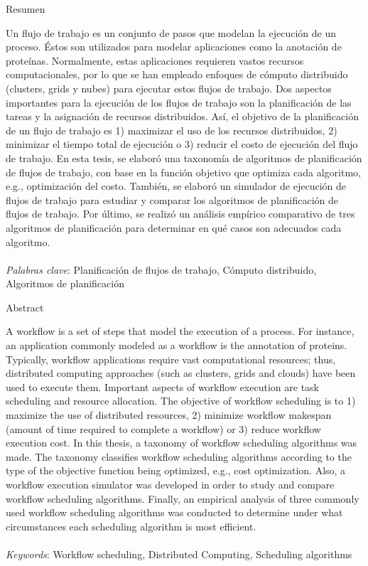 \begin{center}
Resumen
\end{center}
\noindent Un flujo de trabajo es un conjunto de pasos que modelan la ejecución de un proceso. Éstos son utilizados para modelar aplicaciones como la anotación de proteínas. Normalmente, estas aplicaciones requieren vastos recursos computacionales, por lo que se han empleado enfoques de cómputo distribuido (clusters, grids y nubes) para ejecutar estos flujos de trabajo. Dos aspectos importantes para la ejecución de los flujos de trabajo son la planificación de las tareas y la asignación de recursos distribuidos. Así, el objetivo de la planificación de un flujo de trabajo es 1) maximizar el uso de los recursos distribuidos, 2) minimizar el tiempo total de ejecución o 3) reducir el costo de ejecución del flujo de trabajo. En esta tesis, se elaboró una taxonomía de algoritmos de planificación de flujos de trabajo, con base en la función objetivo que optimiza cada algoritmo, e.g., optimización del costo. También, se elaboró un simulador de ejecución de flujos de trabajo para estudiar y comparar los algoritmos de planificación de flujos de trabajo. Por último, se realizó un análisis empírico comparativo de tres algoritmos de planificación para determinar en qué casos son adecuados cada algoritmo.
\\\\
\noindent \emph{Palabras clave}: Planificación de flujos de trabajo, Cómputo distribuido, Algoritmos de planificación

\begin{center}
Abstract
\end{center}
\noindent A workflow is a set of steps that model the execution of a process. For instance, an application commonly modeled as a workflow is the annotation of proteins. Typically, workflow applications require vast computational resources; thus, distributed computing approaches (such as clusters, grids and clouds) have been used to execute them. Important aspects of workflow execution are task scheduling and resource allocation. The objective of workflow scheduling is to 1) maximize the use of distributed resources, 2) minimize workflow makespan (amount of time required to complete a workflow) or 3) reduce workflow execution cost. In this thesis, a taxonomy of workflow scheduling algorithms was made. The taxonomy classifies workflow scheduling algorithms according to the type of the objective function being optimized, e.g., cost optimization. Also, a workflow execution simulator was developed in order to study and compare workflow scheduling algorithms. Finally, an empirical analysis of three commonly used workflow scheduling algorithms was conducted to determine under what circumstances each scheduling algorithm is most efficient.
\\\\
\noindent \emph{Keywords}: Workflow scheduling, Distributed Computing, Scheduling algorithms

\clearpage
